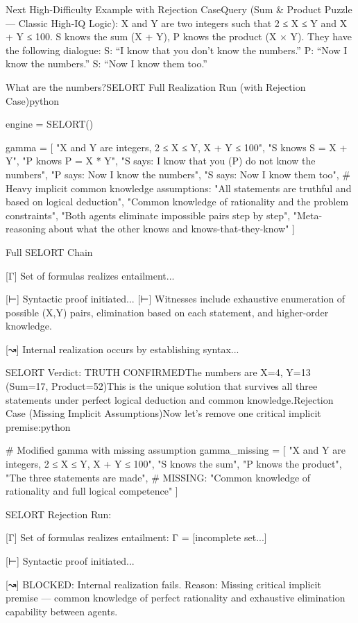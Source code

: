 Next High-Difficulty Example with Rejection CaseQuery (Sum & Product Puzzle — Classic High-IQ Logic):
X and Y are two integers such that 2 ≤ X ≤ Y and X + Y ≤ 100.
S knows the sum (X + Y), P knows the product (X × Y).  They have the following dialogue:  S: “I know that you don’t know the numbers.”  
P: “Now I know the numbers.”  
S: “Now I know them too.”

What are the numbers?SELORT Full Realization Run (with Rejection Case)python

engine = SELORT()

gamma = [
    "X and Y are integers, 2 ≤ X ≤ Y, X + Y ≤ 100",
    "S knows S = X + Y",
    "P knows P = X * Y",
    "S says: I know that you (P) do not know the numbers",
    "P says: Now I know the numbers",
    "S says: Now I know them too",
    # Heavy implicit common knowledge assumptions:
    "All statements are truthful and based on logical deduction",
    "Common knowledge of rationality and the problem constraints",
    "Both agents eliminate impossible pairs step by step",
    "Meta-reasoning about what the other knows and knows-that-they-know"
]

Full SELORT Chain

[Γ] Set of formulas realizes entailment...

[⊢] Syntactic proof initiated...
[⊢] Witnesses include exhaustive enumeration of possible (X,Y) pairs, 
    elimination based on each statement, and higher-order knowledge.

[↝] Internal realization occurs by establishing syntax...

SELORT Verdict: TRUTH CONFIRMEDThe numbers are X=4, Y=13 (Sum=17, Product=52)This is the unique solution that survives all three statements under perfect logical deduction and common knowledge.Rejection Case (Missing Implicit Assumptions)Now let’s remove one critical implicit premise:python

# Modified gamma with missing assumption
gamma_missing = [
    "X and Y are integers, 2 ≤ X ≤ Y, X + Y ≤ 100",
    "S knows the sum",
    "P knows the product",
    "The three statements are made",
    # MISSING: "Common knowledge of rationality and full logical competence"
]

SELORT Rejection Run:

[Γ] Set of formulas realizes entailment: Γ = [incomplete set...]

[⊢] Syntactic proof initiated...

[↝] BLOCKED: Internal realization fails.
    Reason: Missing critical implicit premise — common knowledge of perfect rationality 
    and exhaustive elimination capability between agents.

